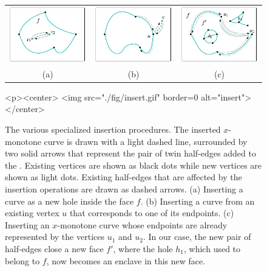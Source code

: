 \begin{figure}[!htp]
\begin{ccTexOnly}
  \begin{center}
  \begin{tabular}{ccc}
    \includegraphics{Arrangement_2/fig/insert_in_face} &
    \includegraphics{Arrangement_2/fig/insert_from_vertex} &
    \includegraphics{Arrangement_2/fig/insert_at_vertices}\\
  {\small (a)} & {\small (b)} & {\small (c)}\\
  \end{tabular}
  \end{center}
\end{ccTexOnly}
\begin{ccHtmlOnly}
  <p><center>
    <img src="./fig/insert.gif" border=0 alt="insert">
  </center>
\end{ccHtmlOnly}
\caption{The various specialized insertion procedures. The
inserted $x$-monotone curve is drawn with a light dashed line,
surrounded by two solid arrows that represent the pair of twin
half-edges added to the \dcel. Existing vertices are shown as
black dots while new vertices are shown as light dots. Existing
half-edges that are affected by the insertion operations are drawn
as dashed arrows. (a) Inserting a curve as a new hole inside the
face $f$. (b) Inserting a curve from an existing vertex $u$ that
corresponds to one of its endpoints. (c) Inserting an $x$-monotone
curve whose endpoints are already represented by the vertices
$u_1$ and $u_2$. In our case, the new pair of half-edges close a
new face $f'$, where the hole $h_1$, which used to belong to $f$,
now becomes an enclave in this new face.} \label{arr_fig:insert}
\end{figure}

